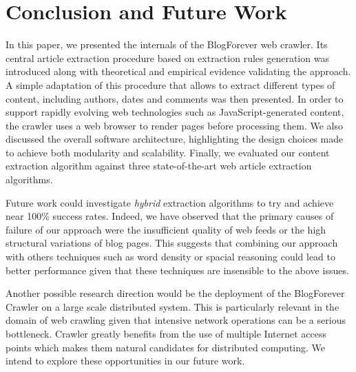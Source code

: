 \section{Conclusion and Future Work}
\label{conclusionandfuturework}

In this paper, we presented the internals of the BlogForever web crawler. Its central article extraction procedure based on extraction rules generation was introduced along with theoretical and empirical evidence validating the approach. A simple adaptation of this procedure that allows to extract different types of content, including authors, dates and comments was then presented. In order to support rapidly evolving web technologies such as JavaScript-generated content, the crawler uses a web browser to render pages before processing them. We also discussed the overall software architecture, highlighting the design choices made to achieve both modularity and scalability. Finally, we evaluated our content extraction algorithm against three state-of-the-art web article extraction algorithms.


Future work could investigate \emph{hybrid} extraction algorithms to try and achieve near 100\% success rates. Indeed, we have observed that the primary causes of failure of our approach were the insufficient quality of web feeds or the high structural variations of blog pages. This suggests that combining our approach with others techniques such as word density or spacial reasoning could lead to better performance given that these techniques are insensible to the above issues.

Another possible research direction would be the deployment of the BlogForever Crawler on a large scale distributed system. This is particularly relevant in the domain of web crawling given that intensive network operations can be a serious bottleneck. Crawler greatly benefits from the use of multiple Internet access points which makes them natural candidates for distributed computing. We intend to explore these opportunities in our future work.
